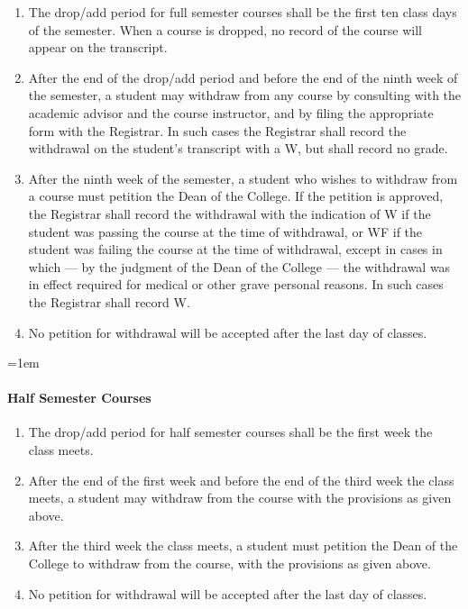 \documentclass{manual}
\newcommand{\modified}[1]{}
\newcommand{\oldbreak}[1]{}
\let\oldparagraph\paragraph
\renewcommand\paragraph{\leftskip=1em\oldparagraph}
\newcommand{\itemLevelA}{\alph*.}
\newcommand{\itemRefA}{\alph*}
\begin{document}
\begin{enumerate}[label=\itemLevelA,ref=\itemRefA]
\item The drop/add period for full semester courses shall be the first ten class days of the semester. When a course is dropped, no record of the course will appear on the transcript.\modified{2/08/11}

\item After the end of the drop/add period and before the end of the ninth \modified{2/08/11} week of the semester, a student may withdraw from any course by consulting with the academic advisor and the course instructor, and by filing the appropriate form with the Registrar. In such cases the Registrar shall record the withdrawal on the student's transcript with a W, but shall record no grade.

\oldbreak{V-5}

\item After the ninth week of the semester, a student who wishes to withdraw from a course\modified{2/03/11} must petition the Dean of the College. If the petition is approved, the Registrar shall record the withdrawal with the indication of W if the student was passing the course at the time of withdrawal, or WF if the student was failing the course at the time of withdrawal, except in cases in which --- by the judgment of the Dean of the College --- the withdrawal was in effect required for medical or other grave personal reasons. In such cases the Registrar shall record W.

\item No petition for withdrawal will be accepted after the last day of classes. 

\end{enumerate}

\paragraph{Half Semester Courses} \modified{5/13/93}

\begin{enumerate}[label=\itemLevelA,ref=\itemRefA]
\item The drop/add period for half semester courses shall be the first week the class meets.

\item After the end of the first week and before the end of the third week the class meets, a student may withdraw from the course with the provisions as given above.

\item  After the third week the class meets, a student must petition the Dean of the College to withdraw from the course, with the provisions as given above.

\item No petition for withdrawal will be accepted after the last day of classes. 
\end{enumerate}
\end{document}
